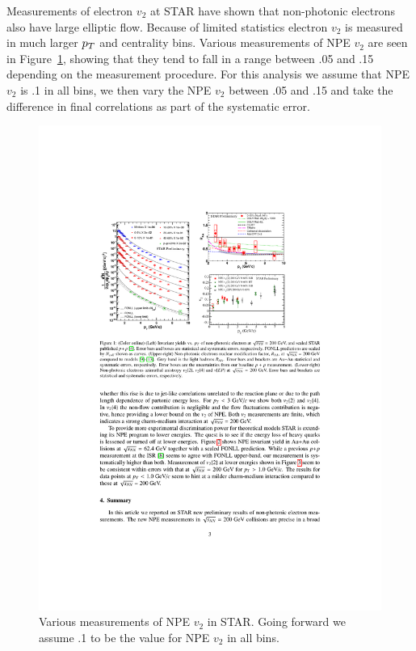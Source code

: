 Measurements of electron $v_2$ at STAR have shown that non-photonic electrons also have large elliptic flow. Because of limited statistics electron $v_2$ is measured in much larger $p_{T}$ and centrality bins. Various measurements of NPE $v_2$ are seen in Figure~\ref{fig:STARNPEv2}, showing that they tend to fall in a range between .05 and .15 depending on the measurement procedure. For this analysis we assume that NPE $v_2$ is .1 in all bins, we then vary the NPE $v_2$ between .05 and .15 and take the difference in final correlations as part of the systematic error. 

\begin{figure}[htbp]
\begin{center}
\includegraphics[scale=2.0]{Plots/Correlations/STAR_NPE_v2.pdf}
\end{center}
\caption[STAR NPE $v_2$]{Various measurements of NPE $v_2$ in STAR. Going forward we assume .1 to be the value for NPE $v_2$ in all bins.}
\label{fig:STARNPEv2}
\end{figure}

